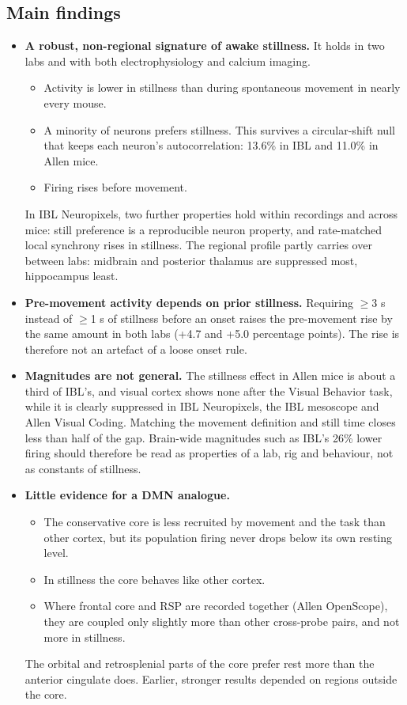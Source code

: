 \documentclass[10pt,a4paper]{article}
\begin{document}
\subsection{Main findings}
\begin{itemize}
\item \textbf{A robust, non-regional signature of awake stillness.} It holds in two labs and with both electrophysiology and calcium imaging. 
\begin{itemize}
\item Activity is lower in stillness than during spontaneous movement in nearly every mouse.
\item A minority of neurons prefers stillness. This survives a circular-shift null that keeps each neuron's autocorrelation: 13.6\% in IBL and 11.0\% in Allen mice.
\item Firing rises before movement.
\end{itemize}
 In IBL Neuropixels, two further properties hold within recordings and across mice: still preference is a reproducible neuron property, and rate-matched local synchrony rises in stillness. The regional profile partly carries over between labs: midbrain and posterior thalamus are suppressed most, hippocampus least.
\item \textbf{Pre-movement activity depends on prior stillness.} Requiring $\geq$3 s instead of $\geq$1 s of stillness before an onset raises the pre-movement rise by the same amount in both labs (+4.7 and +5.0 percentage points). The rise is therefore not an artefact of a loose onset rule.
\item \textbf{Magnitudes are not general.} The stillness effect in Allen mice is about a third of IBL's, and visual cortex shows none after the Visual Behavior task, while it is clearly suppressed in IBL Neuropixels, the IBL mesoscope and Allen Visual Coding. Matching the movement definition and still time closes less than half of the gap. Brain-wide magnitudes such as IBL's 26\% lower firing should therefore be read as properties of a lab, rig and behaviour, not as constants of stillness.
\item \textbf{Little evidence for a DMN analogue.} 
\begin{itemize}
\item The conservative core is less recruited by movement and the task than other cortex, but its population firing never drops below its own resting level.
\item In stillness the core behaves like other cortex.
\item Where frontal core and RSP are recorded together (Allen OpenScope), they are coupled only slightly more than other cross-probe pairs, and not more in stillness.
\end{itemize}
 The orbital and retrosplenial parts of the core prefer rest more than the anterior cingulate does. Earlier, stronger results depended on regions outside the core.
\end{itemize}
\end{document}

